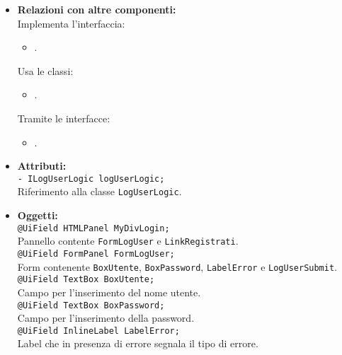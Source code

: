 {\begin{sloppypar}
{{\begin{itemize}
			\item[] \textbf{Relazioni con altre componenti:}\\
				Implementa l'interfaccia:
				\begin{itemize}
					\item[] . 
				\end{itemize}
				Usa le classi:
				\begin{itemize}
					\item[] .
				\end{itemize}
				Tramite le interfacce:
				\begin{itemize}
					\item[] .\\
				\end{itemize}

			\item[] \textbf{Attributi:}\\
				\texttt{- ILogUserLogic logUserLogic;}\\
				Riferimento alla classe \texttt{LogUserLogic}.\\

			\item[] \textbf{Oggetti:}\\
				\texttt{@UiField HTMLPanel MyDivLogin;}\\
				Pannello contente \texttt{FormLogUser} e \texttt{LinkRegistrati}.\\
				
				\texttt{@UiField FormPanel FormLogUser;}\\
				Form contenente \texttt{BoxUtente}, \texttt{BoxPassword}, \texttt{LabelError} e \texttt{LogUserSubmit}.\\
				
				\texttt{@UiField TextBox BoxUtente;}\\
				Campo per l'inserimento del nome utente.\\
				
				\texttt{@UiField TextBox BoxPassword;}\\
				Campo per l'inserimento della password.\\
				
				\texttt{@UiField InlineLabel LabelError;}\\
				Label che in presenza di errore segnala il tipo di errore.\\
				

\end{itemize}}}
\end{sloppypar}}
